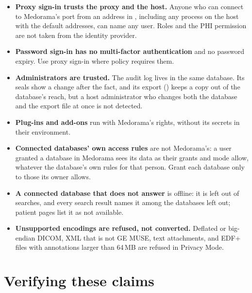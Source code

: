 \begin{itemize}
  identifier) pairs. Two patients given one identifier by one issuer are taken as one patient, and
  one patient with two identifiers as two; Medorama lists the conflicts it notices but cannot
  detect every error (\cref{sec:connecting-identity}).
\item \textbf{Proxy sign-in trusts the proxy and the host.} Anyone who can connect to Medorama's
  port from an address in , including any process on the host with the
  default addresses, can name any user. Roles and the PHI permission are not taken from the
  identity provider.
\item \textbf{Password sign-in has no multi-factor authentication} and no password expiry. Use
  proxy sign-in where policy requires them.
\item \textbf{Administrators are trusted.} The audit log lives in the same database. Its seals
  show a change after the fact, and its export () keeps a copy out of the
  database's reach, but a host administrator who changes both the database and the export file at
  once is not detected.
\item \textbf{Plug-ins and add-ons} run with Medorama's rights, without its secrets in their
  environment.
\item \textbf{Connected databases' own access rules} are not Medorama's: a user granted a database
  in Medorama sees its data as their grants and mode allow, whatever the database's own rules for
  that person. Grant each database only to those its owner allows.
\item \textbf{A connected database that does not answer} is offline: it is left out of searches,
  and every search result names it among the databases left out; patient pages list it as not
  available.
\item \textbf{Unsupported encodings are refused, not converted.} Deflated or big-endian DICOM, XML
  that is not GE MUSE, text attachments, and EDF+ files with annotations larger than 64\,MB are
  refused in Privacy Mode.
\end{itemize}

\section{Verifying these claims}
\label{sec:security-verifying}

